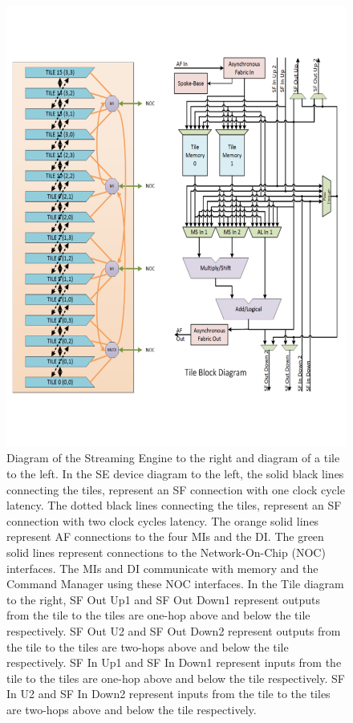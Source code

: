 \begin{figure}
  \centering
  \includegraphics[trim=10 100 8 50, clip, width=\linewidth]{fig/se_device_tile.pdf}
  \caption{
    Diagram of the Streaming Engine to the right and diagram of a tile to the left.
    In the SE device diagram to the left, the solid black lines connecting the tiles, represent an SF connection with one clock cycle latency.
    The dotted black lines connecting the tiles, represent an SF connection with two clock cycles latency.
    The orange solid lines represent AF connections to the four MIs and the DI.
    The green solid lines represent connections to the Network-On-Chip (NOC) interfaces.
    The MIs and DI communicate with memory and the Command Manager using these NOC interfaces.
    In the Tile diagram to the right, SF Out Up1 and SF Out Down1 represent outputs from the tile to the tiles are one-hop above and below the tile respectively.
    SF Out U2 and SF Out Down2 represent outputs from the tile to the tiles are two-hops above and below the tile respectively.
    SF In Up1 and SF In Down1 represent inputs from the tile to the tiles are one-hop above and below the tile respectively.
    SF In U2 and SF In Down2 represent inputs from the tile to the tiles are two-hops above and below the tile respectively.
  }
  \label{fig:se_diagram}
\end{figure}

